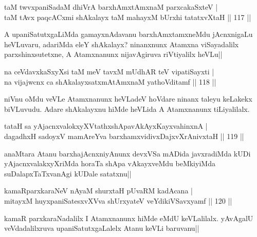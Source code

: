 
\begin{shl}
taM twvxpaniSadaM dhiVrA barxhAmxtAmxnaM parxcakaSxteV |\\
taM tAvx paqcACxmi shAkalayx taM mahayxM bUrxhi tatatxvXtaH \hfill || 117 ||
\end{shl}

\begin{artha}
A upaniSatutxgaLiMda gamayxnAdavanu barxhAmxtamxneMdu jAcnxnigaLu heVLuvaru, adariMda eleY shAkalayx? ninanxnunx Atamxna viSayadalilx parxshinxsutetxne, A Atamxnanunx nijavAgiruva riVtiyalilx heVLu||
\end{artha}

\begin{shl}
na ceVdavxkaSxyXsi taM meV tavxM mUdhAR teV vipatiSayxti |\\
na vijajwcnx ca shAkalayxsatxmAtAmxnaM yathoVditamf \hfill || 118 ||
\end{shl}

\begin{artha}%
niVnu oMdu veVLe Atamxnanunx heVLadeV hoVdare ninanx taleyu keLakekx biVLuvudu. Adare shAkalayxnu hiMde heVLida A Atamxnanunx tiLiyalilalx.
\end{artha}

\begin{shl}
tataH sa yAjacnxvalokxyXVtathxshApavAkAyxKayxvahinxnA |\\
dagadhxH sadoyxV mamAreYva barxhamxvidivxDajxvXrAnivxtaH \hfill || 119 ||
\end{shl}

\begin{artha}
anaMtara Atanu barxhajAcnxniyAnunx devxVSa mADida javxradiMda kUDi yAjacnxvalakxyXriMda horaTa shApa vAkayxveMdu beMkiyiMda suDalapxTaTxvanAgi kUDale satatxnu||
\end{artha}


\begin{shl}
kamaRparxkaraNeV nAyaM shurxtaH pUvaRM kadAcana |\\
mitayxM huyxpaniSatesxvXVva shUrxyateV veYdikiVSavxyamf \hfill || 120 ||
\end{shl}

\begin{artha}
kamaR parxkaraNadalilx I Atamxnanunx hiMde eMdU keVLalilalx. yAvAgalU veVdadalilxruva upaniSatutxgaLalelx Atanu keVLi baruvanu||
\end{artha}

